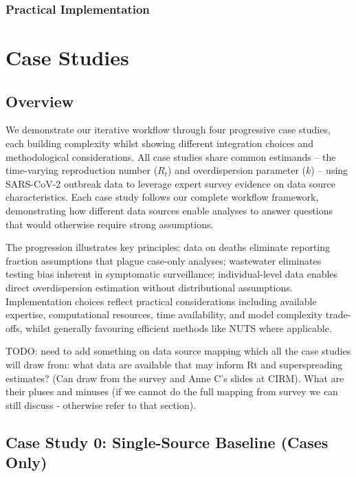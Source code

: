 \documentclass{article}
\begin{document}
\subsubsection{Practical Implementation}

\section{Case Studies}

\subsection{Overview}

We demonstrate our iterative workflow through four progressive case studies, each building complexity whilst showing different integration choices and methodological considerations.
All case studies share common estimands -- the time-varying reproduction number ($R_t$) and overdispersion parameter ($k$) -- using SARS-CoV-2 outbreak data to leverage expert survey evidence on data source characteristics.
Each case study follows our complete workflow framework, demonstrating how different data sources enable analyses to answer questions that would otherwise require strong assumptions.

The progression illustrates key principles: data on deaths eliminate reporting fraction assumptions that plague case-only analyses; wastewater eliminates testing bias inherent in symptomatic surveillance; individual-level data enables direct overdispersion estimation without distributional assumptions.
Implementation choices reflect practical considerations including available expertise, computational resources, time availability, and model complexity trade-offs, whilst generally favouring efficient methods like NUTS where applicable.

TODO: need to add something on data source mapping which all the case studies will draw from: what data are available that may inform Rt and superspreading estimates? (Can draw from the survey and Anne C's slides at CIRM). What are their pluses and minuses (if we cannot do the full mapping from survey we can still discuss - otherwise refer to that section).

\subsection{Case Study 0: Single-Source Baseline (Cases Only)}
\end{document}

